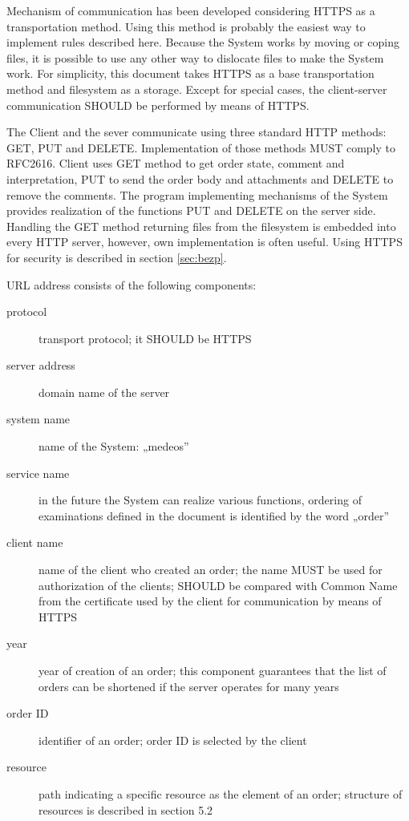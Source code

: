 \documentclass[a4paper]{article}
\begin{document}
Mechanism of communication has been developed considering HTTPS as a transportation method.
Using this method is probably the easiest way to implement rules described here.
Because the System works by moving or coping files, it is possible to use any other way to 
dislocate files to make the System work. For simplicity, this document takes HTTPS as a base
transportation method and filesystem as a storage. Except for special cases, the client-server 
communication SHOULD be performed by means of HTTPS. 

The Client and the sever communicate using three standard HTTP methods: GET, PUT and
DELETE. Implementation of those methods MUST comply to RFC2616. Client uses GET method to
get order state, comment and interpretation, PUT to send the order body and attachments and
DELETE to remove the comments. The program implementing mechanisms of the System provides 
realization of the functions PUT and DELETE on the server side. Handling the GET method 
returning files from the filesystem is embedded into every HTTP server, however, own 
implementation is often useful. Using HTTPS for security is described in section 
\ref{sec:bezp}.

URL address consists of the following components:
\begin{description}
	\item[protocol]	transport protocol; it SHOULD be HTTPS
	\item[server address]	domain name of the server
	\item[system name]	name of the System: „medeos”
	\item[service name]	in the future the System can realize various functions, ordering of 
		examinations defined in the document is identified by the word „order”
	\item[client name]	name of the client who created an order; the name MUST be used for 
		authorization of the clients; SHOULD be compared with Common Name from the certificate 
		used by the client for communication by means of HTTPS
	\item[year]	year of creation of an order; this component guarantees that the list of orders can be shortened if the server operates for many years
	\item[order ID]	identifier of an order; order ID is selected by the client
	\item[resource]	path indicating a specific resource as the element of an order; structure of resources is described in section 5.2
\end{description}
\end{document}
